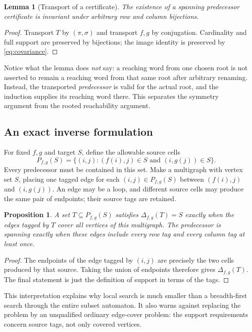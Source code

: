 \documentclass[11pt,letterpaper]{article}
\numberwithin{equation}{section}
\newtheorem{lemma}[theorem]{Lemma}
\newtheorem{proposition}[theorem]{Proposition}
\theoremstyle{definition}
\theoremstyle{remark}
\begin{document}
\begin{lemma}[Transport of a certificate]\label{lem:transport}
The existence of a spanning predecessor certificate is invariant under
arbitrary row and column bijections.
\end{lemma}
\begin{proof}
Transport $T$ by $(\pi,\sigma)$ and transport $f,g$ by conjugation.
Cardinality and full support are preserved by bijections; the image
identity is preserved by \eqref{eq:covariance}.
\end{proof}

Notice what the lemma does \emph{not} say: a reaching word from one chosen
root is not asserted to remain a reaching word from that same root after
arbitrary renaming. Instead, the transported \emph{predecessor} is valid
for the actual root, and the induction supplies its reaching word there.
This separates the symmetry argument from the rooted reachability argument.

\subsection{An exact inverse formulation}
For fixed $f,g$ and target $S$, define the allowable source cells
\[
 P_{f,g}(S)=\{(i,j):(f(i),j)\in S\text{ and }(i,g(j))\in S\}.
\]
Every predecessor must be contained in this set. Make a multigraph with
vertex set $S$, placing one tagged edge for each $(i,j)\in P_{f,g}(S)$
between $(f(i),j)$ and $(i,g(j))$. An edge may be a loop, and different
source cells may produce the same pair of endpoints; their source tags
are retained.

\begin{proposition}\label{prop:edge-cover}
A set $T\subseteq P_{f,g}(S)$ satisfies $\Delta_{f,g}(T)=S$ exactly when
the edges tagged by $T$ cover all vertices of this multigraph. The
predecessor is spanning exactly when these edges include every row tag
and every column tag at least once.
\end{proposition}
\begin{proof}
The endpoints of the edge tagged by $(i,j)$ are precisely the two cells
produced by that source. Taking the union of endpoints therefore gives
$\Delta_{f,g}(T)$. The final statement is just the definition of support
in terms of the tags.
\end{proof}

This interpretation explains why local search is much smaller than a
breadth-first search through the entire subset automaton. It also warns
against replacing the problem by an unqualified ordinary edge-cover
problem: the support requirements concern source tags, not only covered
vertices.
\end{document}
